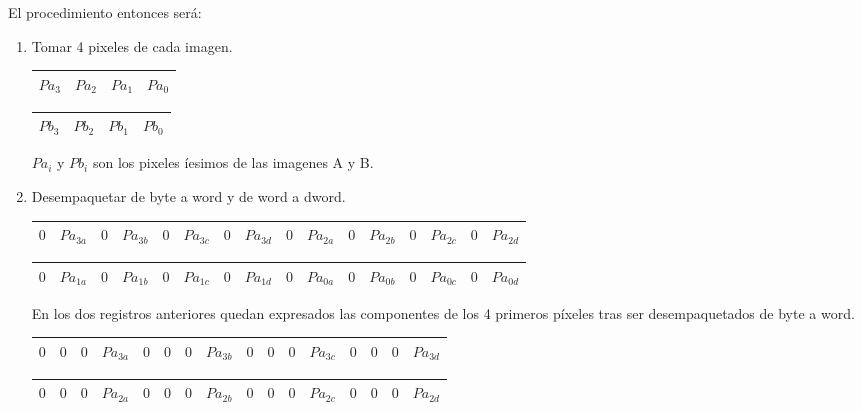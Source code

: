 El procedimiento entonces será:

\begin{enumerate}
\item Tomar 4 pixeles de cada imagen.

\begin{tabular}{| o | o | o | o |} %
\hline
$Pa_{3}$ & $Pa_{2}$ & $Pa_{1}$ & $Pa_{0}$ \\ 
\hline
\end{tabular}

\begin{tabular}{| g | g | g | g |} %
\hline
$Pb_{3}$ & $Pb_{2}$ & $Pb_{1}$ & $Pb_{0}$ \\
\hline
\end{tabular}

$Pa_{i}$ y $Pb_{i}$ son los pixeles íesimos de las imagenes A y B.\\

\item Desempaquetar de byte a word y de word a dword.

\begin{tabular}{| o | o | o | o | o | o | o | o | o | o | o | o | o | o | o | o |} %
\hline
$0$ & $Pa_{3a}$ & $0$ & $Pa_{3b}$ & $0$ & $Pa_{3c}$ & $0$ & $Pa_{3d}$ & $0$ & $Pa_{2a}$ & $0$ & $Pa_{2b}$ & $0$ & $Pa_{2c}$ & $0$ & $Pa_{2d}$ \\ 
\hline
\end{tabular}

\begin{tabular}{| o | o | o | o | o | o | o | o | o | o | o | o | o | o | o | o |} %
\hline
$0$ & $Pa_{1a}$ & $0$ & $Pa_{1b}$ & $0$ & $Pa_{1c}$ & $0$ & $Pa_{1d}$ & $0$ & $Pa_{0a}$ & $0$ & $Pa_{0b}$ & $0$ & $Pa_{0c}$ & $0$ & $Pa_{0d}$ \\ 
\hline
\end{tabular}

En los dos registros anteriores quedan expresados las componentes de los 4 primeros píxeles tras ser desempaquetados de byte a word.

\begin{tabular}{| o | o | o | o | o | o | o | o | o | o | o | o | o | o | o | o |} %
\hline
$0$ & $0$ & $0$ & $Pa_{3a}$ & $0$ & $0$ & $0$ & $Pa_{3b}$ & $0$ & $0$ & $0$ & $Pa_{3c}$ & $0$ & $0$ & $0$ & $Pa_{3d}$ \\ 
\hline
\end{tabular}

\begin{tabular}{| o | o | o | o | o | o | o | o | o | o | o | o | o | o | o | o |} %
\hline
$0$ & $0$ & $0$ & $Pa_{2a}$ & $0$ & $0$ & $0$ & $Pa_{2b}$ & $0$ & $0$ & $0$ & $Pa_{2c}$ & $0$ & $0$ & $0$ & $Pa_{2d}$ \\ 
\hline
\end{tabular}


\end{enumerate}
